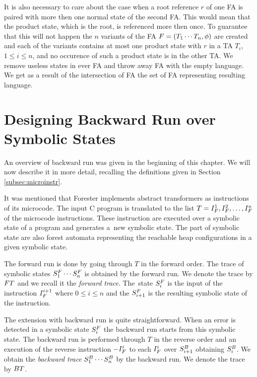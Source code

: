 It is also necessary to care about the case when a root reference $r$ of one FA
is paired with more then one normal state of the second FA.
This would mean that the product state, which is the root,
is referenced more then once.
To guarantee that this will not happen
the $n$ variants of the FA $F=(T_1 \cdots T_n, \phi)$ are created and each of the variants
contains at most one product state with $r$ in a TA $T_i$, $1 \leq i \leq n$, and
no occurence of such a product state is in the other TA.
We remove useless states in ever FA and throw away FA with the empty language.
We get as a result of the intersection of FA the set of FA representing resulting language.

\section{Designing Backward Run over Symbolic States}
\label{sec:brdesign}

An overview of backward run was given in the beginning of this chapter.
We will now describe it in more detail, recalling the definitions given in Section \ref{subsec:microinstr}.

It was mentioned that Forester implements abstract
transformers as instructions of its microcode.
The input C program is translated to the list $T=I^{1}_{F}, I^{2}_{F},\ldots, I^{n}_{F}$
of the microcode instructions.
These instruction are executed over a symbolic state of a program
and generates a~new symbolic state.
The part of symbolic state are also forest automata representing
the reachable heap configurations in a given symbolic state.

The forward run is done by going through $T$ in the forward order.
The trace of symbolic states $S^{F}_1 \cdots S^{F}_n$ is obtained by the forward run.
We denote the trace by $FT$ and we recall it the \emph{forward trace}.
The~state $S^{F}_{i}$ is the input of the instruction $I^{i+1}_{F}$
where $ 0 \leq i \leq n$ and the $S^{F}_{i+1}$ is the resulting symbolic state
of the instruction.

The extension with backward run is quite straightforward.
When an error is detected in a symbolic state $S^{F}_{i}$
the backward run starts from this symbolic state.
The backward run is performed through $T$ in the reverse order
and an execution of the reverse instruction $-I_{F}^{i}$ to each $I^{i}_{F}$
over $S^{B}_{i+1}$ obtaining $S^{B}_{i}$.
We obtain the \emph{backward trace} $S^{B}_1 \cdots S^{B}_n$ by the backward run.
We denote the trace by $BT$.

